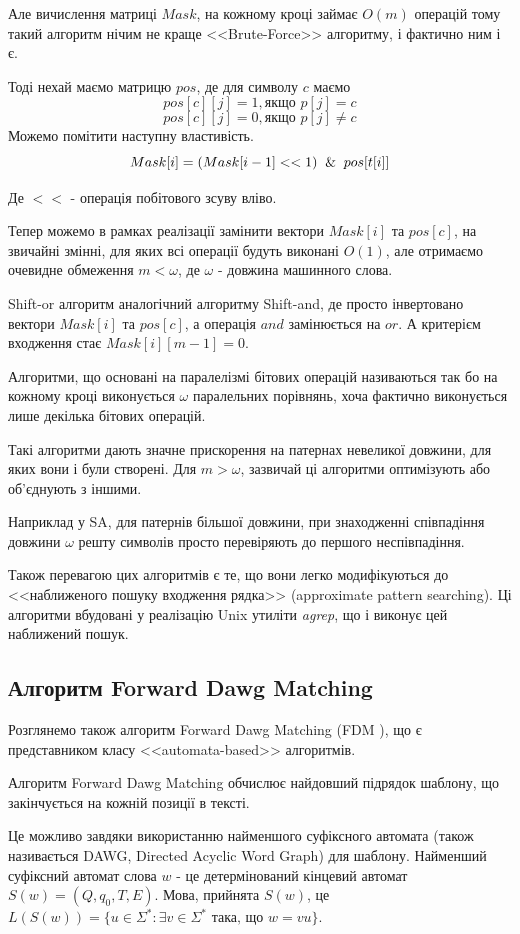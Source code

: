 \documentclass[a4paper,14pt]{extarticle} %
\begin{document}
	Але вичислення матриці $Mask$, на кожному кроці займає $O(m)$ операцій тому такий алгоритм нічим не краще <<Brute-Force>> алгоритму, і фактично ним і є.

	Тоді нехай маємо матрицю $pos$, де для символу $c$ маємо
	\[pos[c][j] = 1,\text{якщо } p[j]=c\]
	\[pos[c][j] = 0,\text{якщо } p[j] \neq c\]
	Можемо помітити наступну властивість. 
	$$Mask[i]=(Mask[i-1]<<1)\And pos[t[i]]$$

	Де $<<$ - операція побітового зсуву вліво.

	Тепер можемо в рамках реалізації замінити вектори $Mask[i]$ та $pos[c]$, на звичайні змінні, для яких всі операції будуть виконані $O(1)$, але отримаємо очевидне обмеження $m<\omega$, де $\omega$ - довжина машинного слова.

	Shift-or алгоритм аналогічний алгоритму Shift-and, де просто інвертовано вектори $Mask[i]$ та $pos[c]$, а операція $and$ замінюється на $or$. 
	А критерієм входження стає $Mask[i][m-1]=0$.

	Алгоритми, що основані на паралелізмі бітових операцій називаються так бо на кожному кроці виконується $\omega$ паралельних порівнянь, хоча фактично виконується лише декілька бітових операцій.

	Такі алгоритми дають значне прискорення на патернах невеликої довжини, для яких вони і були створені. Для $m>\omega$, зазвичай ці алгоритми оптимізують або об'єднують з іншими.

	Наприклад у SA, для патернів більшої довжини, при знаходженні співпадіння довжини $\omega$ решту символів просто перевіряють до першого неспівпадіння.

	Також перевагою цих алгоритмів є те, що вони легко модифікуються до <<наближеного пошуку входження рядка>> (approximate pattern searching).
	Ці алгоритми вбудовані у реалізацію Unix утиліти \textit{agrep}, що і виконує цей наближений пошук.
    
	\subsection{Алгоритм Forward Dawg Matching}
Розглянемо також алгоритм Forward Dawg Matching (FDM \cite{FDM}), що є представником класу <<automata-based>> алгоритмів.

Алгоритм Forward Dawg Matching обчислює найдовший підрядок шаблону, що закінчується на кожній позиції в тексті.

Це можливо завдяки використанню найменшого суфіксного автомата (також називається DAWG, Directed Acyclic Word Graph) для шаблону. Найменший суфіксний автомат слова \( w \) - це детермінований кінцевий автомат \( S(w) = (Q, q_0, T, E) \). Мова, прийнята \( S(w) \), це \( L(S(w)) = \{u \in \Sigma^* : \exists v \in \Sigma^* \text{ така, що } w = vu\} \).
\end{document}
